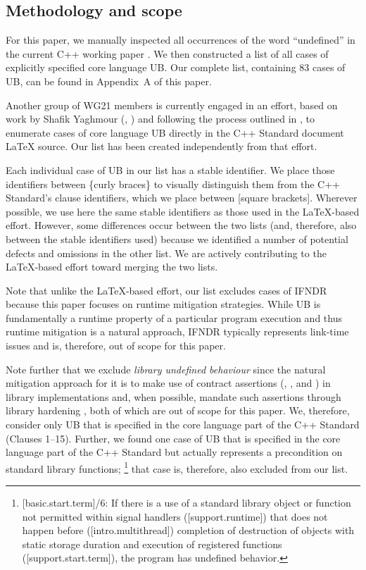 \subsection{Methodology and scope}

For this paper, we manually inspected all occurrences of the word ``undefined'' in the current C++ working paper \cite{N5008}. We then constructed a list of all cases of explicitly specified core language UB. Our complete list, containing 83 cases of UB, can be found in Appendix~A of this paper. %

Another group of WG21 members is currently engaged in an effort, based on work by Shafik Yaghmour (\cite{P1705R1}, \cite{P3075R0}) and following the process outlined in \cite{P3656R1}, to enumerate cases of core language UB directly in the C++ Standard document  \LaTeX{} source. Our list has been created independently from that effort.

Each individual case of UB in our list has a stable identifier. We place those identifiers between \{curly braces\} to visually distinguish them from the C++ Standard's clause identifiers, which we place between [square brackets]. Wherever possible, we use here the same stable identifiers as those used in the \LaTeX-based effort. However, some differences occur between the two lists (and, therefore, also between the stable identifiers used) because we identified a number of potential defects and omissions in the other list. We are actively contributing to the \LaTeX-based effort toward merging the two lists. 

Note that unlike the \LaTeX-based effort, our list excludes cases of IFNDR because this paper focuses on runtime mitigation strategies. While UB is fundamentally a runtime property of a particular program execution and thus runtime mitigation is a natural approach, IFNDR typically represents link-time issues and is, therefore, out of scope for this paper.

Note further that we exclude \emph{library undefined behaviour} since the natural mitigation approach for it is to make use of contract assertions (, , and ) in library implementations and, when possible, mandate such assertions through library hardening \cite{P3471R4}, both of which are out of scope for this paper. We, therefore, consider only UB that is specified in the core language part of the C++ Standard (Clauses 1--15). Further, we found one case of UB that is specified in the core language part of the C++ Standard but actually represents a precondition on standard library functions; %
\footnote{[basic.start.term]/6: If there is a use of a standard library object or function not permitted within signal handlers ([support.runtime]) that does not happen before ([intro.multithread]) completion of destruction of objects with static storage duration and execution of  registered functions ([support.start.term]), the program has undefined behavior.}
that case is, therefore, also excluded from our list.

